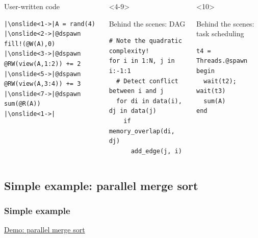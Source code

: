 \documentclass{beamer}
\begin{document}
\begin{frame}[fragile]

\begin{columns}[T]
\begin{exampleblock}{User-written code}
\begin{verbatim}
|\onslide<1->|A = rand(4)
|\onslide<2->|@dspawn fill!(@W(A),0)
|\onslide<3->|@dspawn @RW(view(A,1:2)) += 2
|\onslide<5->|@dspawn @RW(view(A,3:4)) += 3
|\onslide<7->|@dspawn sum(@R(A))
|\onslide<1->|
\end{verbatim}    
\end{exampleblock}
  
\begin{onlyenv}<4-9>
  \begin{exampleblock}{Behind the scenes: DAG}
\begin{verbatim}
# Note the quadratic complexity!
for i in 1:N, j in i:-1:1
  # Detect conflict between i and j
  for di in data(i), dj in data(j)
    if memory_overlap(di, dj)
      add_edge(j, i)
\end{verbatim}
\end{exampleblock}
\end{onlyenv}
\begin{onlyenv}<10>
\begin{exampleblock}{Behind the scenes: task scheduling}
\begin{verbatim}
t4 = Threads.@spawn begin
  wait(t2); wait(t3)
  sum(A)
end
\end{verbatim}
\end{exampleblock}
\end{onlyenv}
\end{columns}


\end{frame}

\subsection{Simple example: parallel merge sort}

\begin{frame}
\frametitle{Simple example}
\center \href{run:./sort.slides.html}{\LARGE{Demo: parallel merge sort}}

\end{frame}
\end{document}
